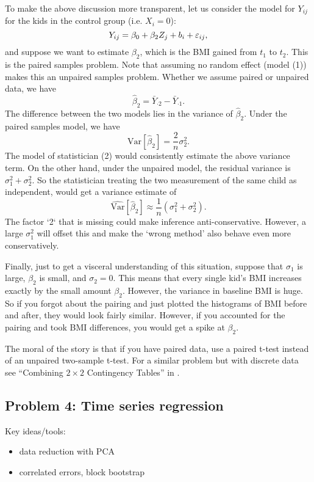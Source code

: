 To make the above discussion more transparent, let us consider the model for $Y_{ij}$ for the kids in the control group (i.e. $X_i = 0$):
\begin{equation*}
Y_{ij} = \beta_0 + \beta_2 Z_j + b_i + {\varepsilon}_{ij},
\end{equation*}
and suppose we want to estimate $\beta_2$, which is the BMI gained from $t_1$ to $t_2$. This is the paired samples problem. Note that assuming no random effect (model (1)) makes this an unpaired samples problem. Whether we assume paired or unpaired data, we have
\begin{equation*}
\hat \beta_2 = \bar Y_{\cdot 2} - \bar Y_{\cdot 1}.
\end{equation*}
The difference between the two models lies in the variance of $\hat \beta_2$. Under the paired samples model, we have
\begin{equation*}
\text{Var}[\hat \beta_2] = \frac{2}{n}\sigma_2^2.
\end{equation*}
The model of statistician (2) would consistently estimate the above variance term. On the other hand, under the unpaired model, the residual variance is $\sigma_1^2 + \sigma_2^2$. So the statistician treating the two measurement of the same child as independent, would get a variance estimate of
\begin{equation*}
\widehat{\text{Var}}[\hat \beta_2] \approx \frac{1}{n}(\sigma_1^2 + \sigma_2^2).
\end{equation*}
The factor `2` that is missing could make inference anti-conservative. However, a large $\sigma_1^2$ will offset this and make the `wrong method' also behave even more conservatively.

Finally, just to get a visceral understanding of this situation, suppose that $\sigma_1$ is large, $\beta_2$ is small, and $\sigma_2 = 0$. This means that every single kid's BMI increases exactly by the small amount $\beta_2$. However, the variance in baseline BMI is huge. So if you forgot about the pairing and just plotted the histograms of BMI before and after, they would look fairly similar. However, if you accounted for the pairing and took BMI differences, you would get a spike at $\beta_2$.

The moral of the story is that if you have paired data, use a paired t-test instead of an unpaired two-sample t-test. For a similar problem but with discrete data see ``Combining $2\times 2$ Contingency Tables'' in \citet{millerCasebook}.


\subsection*{Problem 4: Time series regression}
Key ideas/tools:
\begin{itemize}
	\item data reduction with PCA
	\item correlated errors, block bootstrap
\end{itemize}

